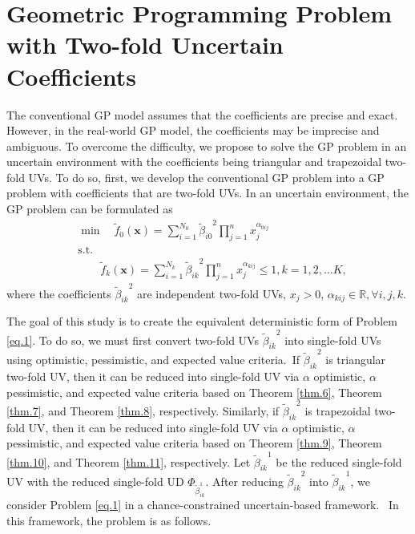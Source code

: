 \section{ Geometric Programming Problem with Two-fold Uncertain Coefficients }\label{sec.4} 
The conventional GP model assumes that the coefficients are precise and exact. However, in the real-world GP model, the coefficients may be imprecise and ambiguous. To overcome the difficulty, we propose to solve the GP problem in an uncertain environment with the coefficients being triangular and trapezoidal two-fold UVs. To do so, first, we develop the conventional GP problem into a GP problem with coefficients that are two-fold UVs. In an uncertain environment, the GP problem can be formulated as
	\begin{equation}\label{eq.1}
	\begin{aligned}
		&	\min \quad \tilde{f}_0{(\textbf{x})}=\sum\limits_{i=1}^{N_0}{\tilde{\beta}_{i0}}^2\prod\limits_{j=1}^{n}x_j^{\alpha_{0ij}}\\
		&	\text{s.t.}\\
		& \qquad \tilde{f}_k{(\textbf{x})}=\sum\limits_{i=1}^{N_k}{\tilde{\beta}_{ik}}^2\prod\limits_{j=1}^{n}x_j^{\alpha_{kij}}\leq 1,k=1,2,\ldots K,
	\end{aligned}
\end{equation}
where the coefficients ${\tilde{\beta}_{ik}}^2$ are independent two-fold UVs, $x_j>0$, $\alpha_{kij} \in \mathbb{R},\forall i,j,k$. 
\par The goal of this study is to create the equivalent deterministic form of Problem \ref{eq.1}. To do so, we must first convert two-fold UVs ${\tilde{\beta}_{ik}}^2$ into single-fold UVs using optimistic, pessimistic, and expected value criteria. If ${\tilde{\beta}_{ik}}^2$ is triangular two-fold UV, then it can be reduced into single-fold UV via $\alpha$ optimistic, $\alpha$ pessimistic, and expected value criteria based on Theorem \ref{thm.6}, Theorem \ref{thm.7}, and Theorem \ref{thm.8}, respectively. Similarly, if ${\tilde{\beta}_{ik}}^2$ is trapezoidal two-fold UV, then it can be reduced into single-fold UV via $\alpha$ optimistic, $\alpha$ pessimistic, and expected value criteria based on Theorem \ref{thm.9}, Theorem \ref{thm.10}, and Theorem \ref{thm.11}, respectively. Let ${\tilde{\beta}_{ik}}^1$ be the reduced single-fold UV with the reduced single-fold UD $\Phi_{\tilde{\beta}_{ik}^1}$. After reducing ${\tilde{\beta}_{ik}}^2$ into ${\tilde{\beta}_{ik}}^1$, we consider Problem \ref{eq.1} in a chance-constrained uncertain-based framework.  In this framework, the problem is as follows. 

